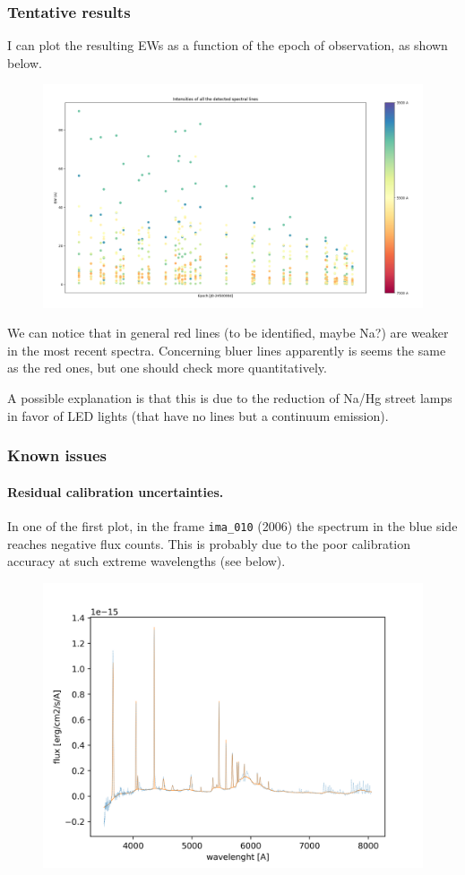 \documentclass{article}
\begin{document}
\subsubsection{Tentative results}
I can plot the resulting EWs as a function of the epoch of observation, as shown below.
\begin{figure}[h!]
	\centering
	\includegraphics[width=.9\textwidth]{../EWs}
\end{figure}
We can notice that in general red lines (to be identified, maybe Na?) are weaker in the most recent spectra. Concerning bluer lines apparently is seems the same as the red ones, but one should check more quantitatively.

A possible explanation is that this is due to the reduction of Na/Hg street lamps in favor of LED lights (that have no lines but a continuum emission).

\subsubsection{Known issues}
\paragraph{Residual calibration uncertainties.} In one of the first plot, in the frame \texttt{ima\_010} (2006) the spectrum in the blue side reaches negative flux counts. This is probably due to the poor calibration accuracy at such extreme wavelengths (see below).
\begin{figure}[h!]
	\centering
	\includegraphics[width=.5\textwidth]{./2006}
\end{figure}
\end{document}
